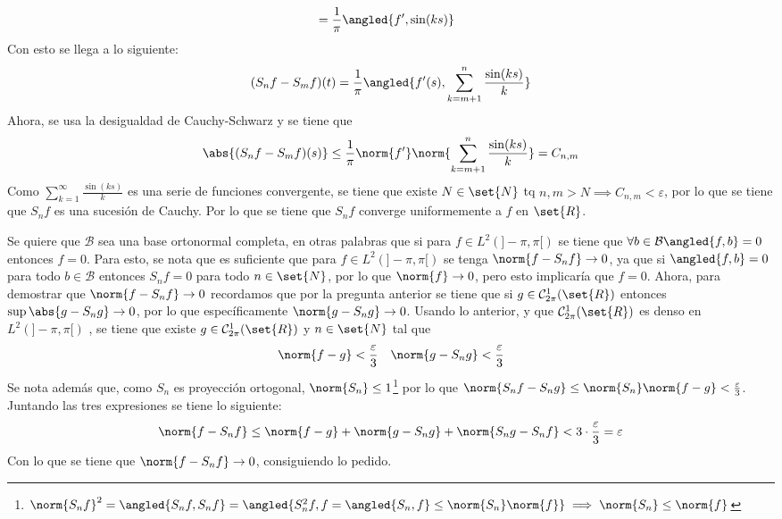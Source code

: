 \documentclass{homework}
\newcommand{\LP}{\ensuremath{L^2(]-\pi,\pi[)} }
\begin{document}
\begin{sol}[1.d]
\begin{align*}
        &=\frac1\pi\angled{f',\sin(ks)}
    \end{align*}
    Con esto se llega a lo siguiente:
    \begin{equation*}
        (S_n f-S_m f)(t)=\frac1\pi\angled{f'(s),\sum_{k=m+1}^n\frac{\sin(ks)}k}
    \end{equation*}
    Ahora, se usa la desigualdad de Cauchy-Schwarz y se tiene que
    \[\abs{(S_n f-S_m f)(s)}\leq\frac1\pi\norm{f'}\norm{\sum_{k=m+1}^n\frac{\sin(ks)}k}=C_{n,m}\]
    Como \(\sum_{k=1}^\infty\frac{\sin(ks)}k\) es una serie de funciones convergente, se tiene que existe \(N\in\set{N}\) tq \(n,m>N\implies C_{n,m}<\varepsilon\), por lo que se tiene que \(S_n f\) es una sucesión de Cauchy. Por lo que se tiene que \(S_n f\) converge uniformemente a \(f\) en \(\set{R}\).
\end{sol}
\begin{sol}[1.e]
    Se quiere que \(\mathcal{B}\) sea una base ortonormal completa, en otras palabras que si para \(f\in\LP\) se tiene que \(\forall b\in\mathcal{B}\angled{f,b}=0\) entonces \(f=0\). Para esto, se nota que es suficiente que para \(f\in\LP\) se tenga \(\norm{f-S_nf}\rightarrow 0\), ya que si \(\angled{f,b}=0\) para todo \(b\in\mathcal{B}\) entonces \(S_n f=0\) para todo \(n\in\set{N}\), por lo que \(\norm{f}\rightarrow 0\), pero esto implicaría que \(f=0\). Ahora, para demostrar que \(\norm{f-S_nf}\rightarrow 0\) recordamos que por la pregunta anterior se tiene que si \(g\in\mathcal{C}_{2\pi}^1(\set{R})\) entonces \(\sup\abs{g-S_n g}\rightarrow 0\), por lo que específicamente \(\norm{g-S_n g}\rightarrow 0\). Usando lo anterior, y que \(\mathcal{C}_{2\pi}^1(\set{R})\) es denso en \LP, se tiene que existe \(g\in\mathcal{C}_{2\pi}^1(\set{R})\) y \(n\in\set{N}\) tal que
    \begin{align*}
        &\norm{f-g}<\frac\varepsilon3 &\norm{g-S_n g}<\frac\varepsilon3
    \end{align*}
    Se nota además que, como \(S_n\) es proyección ortogonal, \(\norm{S_n}\leq 1\)\footnote{\(\norm{S_n f}^2=\angled{S_n f, S_n f}=\angled{S_n^2 f, f=\angled{S_n, f}\leq\norm{S_n}\norm{f}}\implies\norm{S_n}\leq\norm{f}\)} por lo que \(\norm{S_n f-S_n g}\leq\norm{S_n}\norm{f-g}<\frac\varepsilon3\). Juntando las tres expresiones se tiene lo siguiente:
    \begin{equation*}
        \norm{f-S_n f}\leq\norm{f-g}+\norm{g-S_n g}+\norm{S_n g-S_n f}<3\cdot\frac\varepsilon3=\varepsilon
    \end{equation*}
    Con lo que se tiene que \(\norm{f-S_n f}\rightarrow 0\), consiguiendo lo pedido.
\end{sol}
\end{document}
